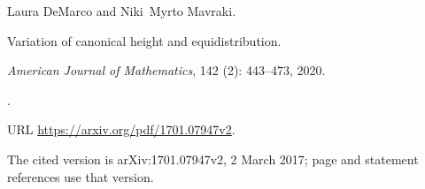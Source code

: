 Laura DeMarco and Niki~Myrto Mavraki.

\newblock Variation of canonical height and equidistribution.

\newblock \emph{American Journal of Mathematics}, 142 (2):
  443--473, 2020.

\newblock {}.

\newblock URL \url{https://arxiv.org/pdf/1701.07947v2}.

\newblock The cited version is arXiv:1701.07947v2, 2 March 2017; page and statement references use that version.
